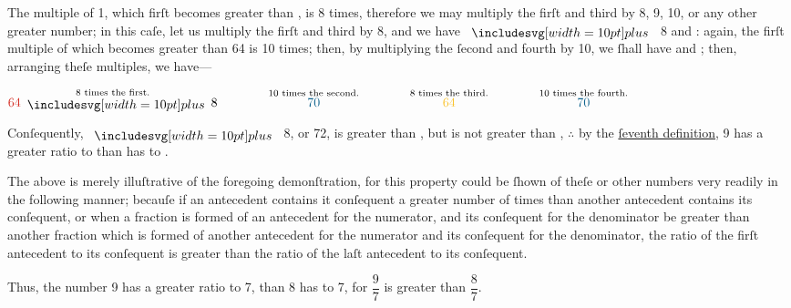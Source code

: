 \documentclass[12pt,preview]{standalone}
\begin{document}
\begin{minipage}{\textwidth}
    The multiple of 1, which firſt becomes greater than {\color{cblue}{7}}, is 8 times, therefore we may multiply the firſt and third by 8, 9, 10, or any other greater number; in this caſe, let us multiply the firſt and third by 8, and we have {\color{cred}{64}} $\bplus$ 8 and {\color{cyellow}{64}}: again, the firſt multiple of {\color{cblue}{7}} which becomes greater than 64 is 10 times; then, by multiplying the ſecond and fourth by 10, we ſhall have {\color{cblue}{70}} and {\color{cblue}{70}}; then, arranging theſe multiples, we have---\\

    \hfill

    \begin{center}
        $\overset{\text{8 times the first.}}{{\color{cred}{64}} \bplus 8} \qquad\qquad \overset{\text{10 times the second.}}{{\color{cblue}{70}}} \qquad\qquad \overset{\text{8 times the third.}}{{\color{cyellow}{64}}} \qquad\qquad \overset{\text{10 times the fourth.}}{{\color{cblue}{70}}}$\\
    \end{center}

    Conſequently, {\color{cred}{64}} $\bplus$ 8, or 72, is greater than {\color{cblue}{70}}, but {\color{cyellow}{64}} is not greater than {\color{cblue}{70}}, $\therefore$ by the \hyperref[book5def7]{ſeventh definition}, 9 has a greater ratio to {\color{cblue}{7}} than {\color{cyellow}{8}} has to {\color{cblue}{7}}.\\

    \hfill

    The above is merely illuſtrative of the foregoing demonſtration, for this property could be ſhown of theſe or other numbers very readily in the following manner; becauſe if an antecedent contains it conſequent a greater number of times than another antecedent contains its conſequent, or when a fraction is formed of an antecedent for the numerator, and its conſequent for the denominator be greater than another fraction which is formed of another antecedent for the numerator and its conſequent for the denominator, the ratio of the firſt antecedent to its conſequent is greater than the ratio of the laſt antecedent to its conſequent.\\

    \hfill

    Thus, the number 9 has a greater ratio to 7, than 8 has to 7, for $\dfrac{\text{9}}{\text{7}}$ is greater than $\dfrac{\text{8}}{\text{7}}$.\\


\end{minipage}
\end{document}
